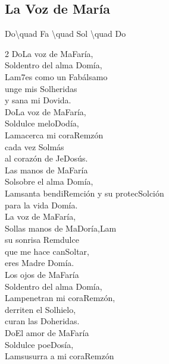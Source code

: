 \subsection{La Voz de María}

\begin{center}
\ac{Do\quad Fa \quad Sol \quad Do}\\
\begin{multicols}{2}
{\large
\ac{Do}La voz de Ma\ac{Fa}ría,\\
\ac{Sol}dentro del alma \ac{Do}mía,\\
\ac{Lam7}es como un \ac{Fa}bálsamo\\
unge mis \ac{Sol}heridas\\
y sana mi \ac{Do}vida.\\
\vspace{1em}
\ac{Do}La voz de Ma\ac{Fa}ría,\\
\ac{Sol}dulce melo\ac{Do}día,\\
\ac{Lam}acerca mi cora\ac{Rem}zón\\
cada vez \ac{Sol}más\\
al corazón de Je\ac{Do}sús.\\
\vspace{1em}
Las manos de Ma\ac{Fa}ría\\
\ac{Sol}sobre el alma \ac{Do}mía,\\
\ac{Lam}santa bendi\ac{Rem}ción y su protec\ac{Sol}ción\\
para la vida \ac{Do}mía.\\
\vspace{1em}
La voz de Ma\ac{Fa}ría,\\
\ac{Sol}las manos de Ma\ac{Do}ría,\ac{Lam}\\
su sonrisa \ac{Rem}dulce\\
que me hace can\ac{Sol}tar,\\
eres Madre \ac{Do}mía.\\
\vspace{1em}
Los ojos de Ma\ac{Fa}ría\\
\ac{Sol}dentro del alma \ac{Do}mía,\\
\ac{Lam}penetran mi cora\ac{Rem}zón,\\
derriten el \ac{Sol}hielo,\\
curan las \ac{Do}heridas.\\
\vspace{1em}
\ac{Do}El amor de Ma\ac{Fa}ría\\
\ac{Sol}dulce poe\ac{Do}sía,\\
\ac{Lam}susurra a mi cora\ac{Rem}zón\\
}
\end{multicols}
\end{center}
